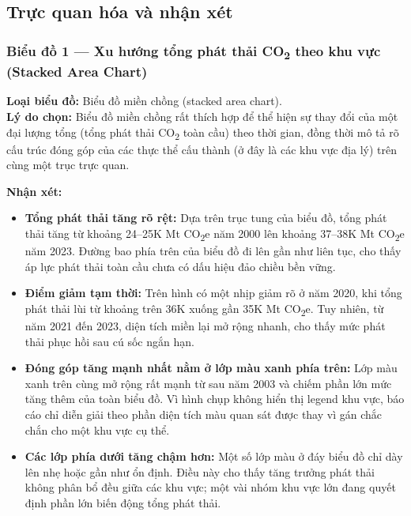 \subsection{Trực quan hóa và nhận xét}

\subsubsection{Biểu đồ 1 --- Xu hướng tổng phát thải CO\textsubscript{2} theo khu vực (Stacked Area Chart)}

\textbf{Loại biểu đồ:} Biểu đồ miền chồng (stacked area chart).\\
\textbf{Lý do chọn:} Biểu đồ miền chồng rất thích hợp để thể hiện sự thay đổi của một đại lượng tổng (tổng phát thải CO\textsubscript{2} toàn cầu) theo thời gian, đồng thời mô tả rõ cấu trúc đóng góp của các thực thể cấu thành (ở đây là các khu vực địa lý) trên cùng một trục trực quan.


\textbf{Nhận xét:}
\begin{itemize}
    \item \textbf{Tổng phát thải tăng rõ rệt:} Dựa trên trục tung của biểu đồ, tổng phát thải tăng từ khoảng 24--25K Mt CO\textsubscript{2}e năm 2000 lên khoảng 37--38K Mt CO\textsubscript{2}e năm 2023. Đường bao phía trên của biểu đồ đi lên gần như liên tục, cho thấy áp lực phát thải toàn cầu chưa có dấu hiệu đảo chiều bền vững.
    \item \textbf{Điểm giảm tạm thời:} Trên hình có một nhịp giảm rõ ở năm 2020, khi tổng phát thải lùi từ khoảng trên 36K xuống gần 35K Mt CO\textsubscript{2}e. Tuy nhiên, từ năm 2021 đến 2023, diện tích miền lại mở rộng nhanh, cho thấy mức phát thải phục hồi sau cú sốc ngắn hạn.
    \item \textbf{Đóng góp tăng mạnh nhất nằm ở lớp màu xanh phía trên:} Lớp màu xanh trên cùng mở rộng rất mạnh từ sau năm 2003 và chiếm phần lớn mức tăng thêm của toàn biểu đồ. Vì hình chụp không hiển thị legend khu vực, báo cáo chỉ diễn giải theo phần diện tích màu quan sát được thay vì gán chắc chắn cho một khu vực cụ thể.
    \item \textbf{Các lớp phía dưới tăng chậm hơn:} Một số lớp màu ở đáy biểu đồ chỉ dày lên nhẹ hoặc gần như ổn định. Điều này cho thấy tăng trưởng phát thải không phân bổ đều giữa các khu vực; một vài nhóm khu vực lớn đang quyết định phần lớn biến động tổng phát thải.
\end{itemize}

